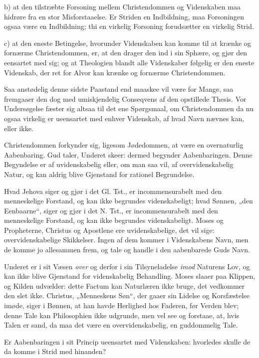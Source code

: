 \documentclass[12pt,a4paper]{book}
\newcommand{\opage}[1]{\marginnote{\footnotesize\textit{[#1]}}}
\begin{document}
b) at den tilstræbte Forsoning mellem Christendommen og Videnskaben maa
hidrøre fra en stor Misforstaaelse. Er Striden en Indbildning, maa
Forsoningen ogsaa være en Indbildning; thi en virkelig Forsoning
forudsætter en virkelig Strid.

c) at den eneste Betingelse, hvorunder Videnskaben kan komme til at
krænke og fornærme Christendommen, er, at den drager den ind i sin
Sphære, og gjør den eensartet med sig; og at Theologien blandt alle
Videnskaber følgelig er den eneste Videnskab, der ret for Alvor kan
krænke og fornærme Christendommen.

Saa anstødelig denne sidste Paastand end maaskee vil være for Mange, saa
fremgaaer den dog med umiskjendelig Conseqvens af den opstillede Thesis.
Vor Undersøgelse fæster sig altsaa til det ene Spørgsmaal, om
Christendommen da nu ogsaa virkelig
\opage{4} er ueensartet med enhver Videnskab, af hvad Navn nævnes kan, eller ikke.

Christendommen forkynder sig, ligesom Jødedommen, at være en overnaturlig
Aabenbaring. Gud taler, Underet skeer: dermed begynder Aabenbaringen.
Denne Begyndelse er af uvidenskabelig eller, om man saa vil, af
overvidenskabelig Natur, og kan aldrig blive Gjenstand for rationel
Begrundelse.

Hvad Jehova siger og gjør i det Gl. Tst., er incommensurabelt med den
menneskelige Forstand, og kan ikke begrundes videnskabeligt; hvad Sønnen,
„den Eenbaarne“, siger og gjør i det N. Tst., er incommensurabelt med den
menneskelige Forstand, og kan ikke begrundes videnskabeligt. Moses og
Propheterne, Christus og Apostlene ere uvidenskabelige, det vil sige:
overvidenskabelige Skikkelser. Ingen af dem kommer i Videnskabens Navn,
men de komme jo allesammen frem, og tale og handle i den aabenbarede Guds
Navn.

Underet er i sit Væsen \emph{over} og derfor i sin Tilsyneladelse \emph{imod} Naturens
Lov, og kan ikke blive Gjenstand for videnskabelig Behandling. Moses
slaaer paa Klippen, og Kilden udvælder: dette Factum kan Naturlæren ikke
bruge, det vedkommer den slet ikke. Christus, „Menneskens Søn“, der
gaaer sin Lidelse og Korsfæstelse imøde, siger i Bønnen, at han havde
Herlighed hos Faderen, før Verden blev; denne Tale kan Philosophien ikke
udgrunde, men vel see og forstaae, at, hvis Talen er sand, da maa det
være en overvidenskabelig, en guddommelig Tale.

Er Aabenbaringen i sit Princip ueensartet med Videnskaben: hvorledes
skulle de da komme i Strid med hinanden?
\end{document}
